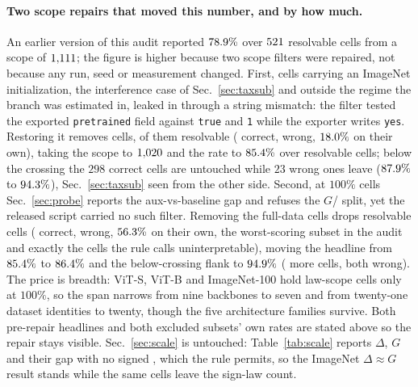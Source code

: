 \paragraph{Two scope repairs that moved this number, and by how much.}
 An earlier version of this audit reported $78.9\%$
over $521$ resolvable cells from a scope of
$1{,}111$; the figure is higher because two scope filters were
repaired, not because any run, seed or measurement changed. First, cells
carrying an ImageNet initialization, the interference case of
Sec.~\ref{sec:taxsub} and outside the regime the \readout{} branch was
estimated in, leaked in through a string mismatch: the filter tested the
exported \texttt{pretrained} field against \texttt{true} and \texttt{1}
while the exporter writes \texttt{yes}. Restoring it removes
\auditExclCells{} cells, \auditExclResolvable{} of them resolvable
(\auditExclCorrect{} correct, \auditExclWrong{} wrong,
$18.0\%$ on their own), taking the scope to $1{,}020$
and the rate to $85.4\%$ over \auditMidResolvable{} resolvable
cells; below the
crossing the $298$ correct cells are untouched while $23$ wrong ones leave
($87.9\%$ to $94.3\%$),
Sec.~\ref{sec:taxsub} seen from the other side. Second, at $100\%$ cells
Sec.~\ref{sec:probe} reports the aux-vs-baseline gap and refuses the
$G$/\readout{} split, yet the released script carried no such filter.
Removing the \auditHundredCells{} full-data cells drops
\auditHundredResolvable{} resolvable cells (\auditHundredCorrect{} correct,
\auditHundredWrong{} wrong, $56.3\%$ on their own, the
worst-scoring subset in the audit and exactly the cells the rule calls
uninterpretable), moving the headline from $85.4\%$ to
$86.4\%$ and the below-crossing flank to $94.9\%$
(\auditHundredBelow{} more cells, both wrong). The price is breadth: ViT-S,
ViT-B and ImageNet-100 hold law-scope cells only at $100\%$, so the span
narrows from nine backbones to seven and from twenty-one dataset identities
to twenty, though the five architecture families survive. Both pre-repair
headlines and both excluded subsets' own rates are stated above so the
repair stays visible. Sec.~\ref{sec:scale} is untouched:
Table~\ref{tab:scale} reports $\Delta$, $G$ and their gap with no signed
\readout{}, which the rule permits, so the ImageNet $\Delta \approx G$
result stands while the same cells leave the sign-law count.

